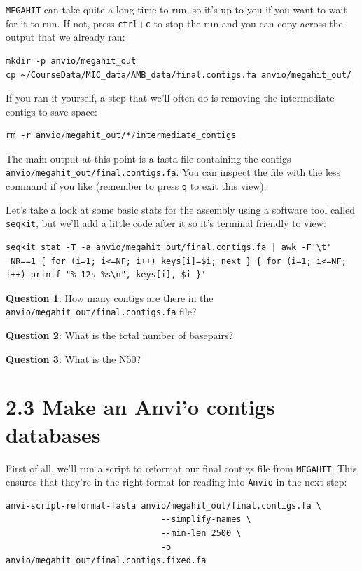 \documentclass[
]{book}
\begin{document}
\texttt{MEGAHIT} can take quite a long time to run, so it's up to you if you want to wait for it to run. If not, press \texttt{ctrl}+\texttt{c} to stop the run and you can copy across the output that we already ran:

\begin{verbatim}
mkdir -p anvio/megahit_out
cp ~/CourseData/MIC_data/AMB_data/final.contigs.fa anvio/megahit_out/
\end{verbatim}

If you ran it yourself, a step that we'll often do is removing the intermediate contigs to save space:

\begin{verbatim}
rm -r anvio/megahit_out/*/intermediate_contigs
\end{verbatim}

The main output at this point is a fasta file containing the contigs \texttt{anvio/megahit\_out/final.contigs.fa}. You can inspect the file with the less command if you like (remember to press \texttt{q} to exit this view).

Let's take a look at some basic stats for the assembly using a software tool called \texttt{seqkit}, but we'll add a little code after it so it's terminal friendly to view:

\begin{verbatim}
seqkit stat -T -a anvio/megahit_out/final.contigs.fa | awk -F'\t' 'NR==1 { for (i=1; i<=NF; i++) keys[i]=$i; next } { for (i=1; i<=NF; i++) printf "%-12s %s\n", keys[i], $i }'
\end{verbatim}

\textbf{Question 1}: How many contigs are there in the \texttt{anvio/megahit\_out/final.contigs.fa} file?

\textbf{Question 2}: What is the total number of basepairs?

\textbf{Question 3}: What is the N50?

\section{2.3 Make an Anvi'o contigs databases}\label{make-an-anvio-contigs-databases}

First of all, we'll run a script to reformat our final contigs file from \texttt{MEGAHIT}. This ensures that they're in the right format for reading into \texttt{Anvi\textquotesingle{}o} in the next step:

\begin{verbatim}
anvi-script-reformat-fasta anvio/megahit_out/final.contigs.fa \
                               --simplify-names \
                               --min-len 2500 \
                               -o anvio/megahit_out/final.contigs.fixed.fa
\end{verbatim}
\end{document}
